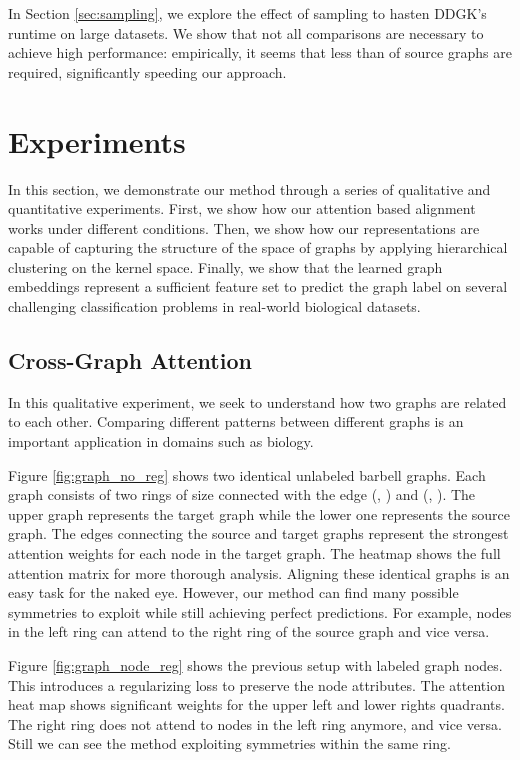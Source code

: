 \documentclass[sigconf]{acmart}
\newcommand{\ours}{\textsc{DDGK}}
\begin{document}
In Section \ref{sec:sampling}, we explore the effect of sampling to hasten \ours{}'s runtime on large datasets.  
We show that not all  comparisons are necessary to achieve high performance: empirically, it seems that less than  of source graphs are required, significantly speeding our approach.


\section{Experiments}
In this section, we demonstrate our method through a series of qualitative and quantitative experiments.
First, we show how our attention based alignment works under different conditions.
Then, we show how our representations are capable of capturing the structure of the space of graphs by applying hierarchical clustering on the kernel space.
Finally, we show that the learned graph embeddings represent a sufficient feature set to predict the graph label on several challenging classification problems in real-world biological datasets.

\subsection{Cross-Graph Attention}

In this qualitative experiment, we seek to understand how two graphs are related to each other.
Comparing different patterns between different graphs is an important application in domains such as biology.

Figure \ref{fig:graph_no_reg} shows two identical unlabeled barbell graphs.
Each graph consists of two rings of size  connected with the edge (, ) and (, ).
The upper graph represents the target graph while the lower one represents the source graph.
The edges connecting the source and target graphs represent the strongest attention weights for each node in the target graph.
The heatmap shows the full attention matrix for more thorough analysis.
Aligning these identical graphs is an easy task for the naked eye.
However, our method can find many possible symmetries to exploit while still achieving perfect predictions.
For example, nodes in the left ring can attend to the right ring of the source graph and vice versa.

Figure \ref{fig:graph_node_reg} shows the previous setup with labeled graph nodes.
This introduces a regularizing loss to preserve the node attributes.
The attention heat map shows significant weights for the upper left and lower rights quadrants.
The right ring does not attend to nodes in the left ring anymore, and vice versa.
Still we can see the method exploiting symmetries within the same ring.
\end{document}
